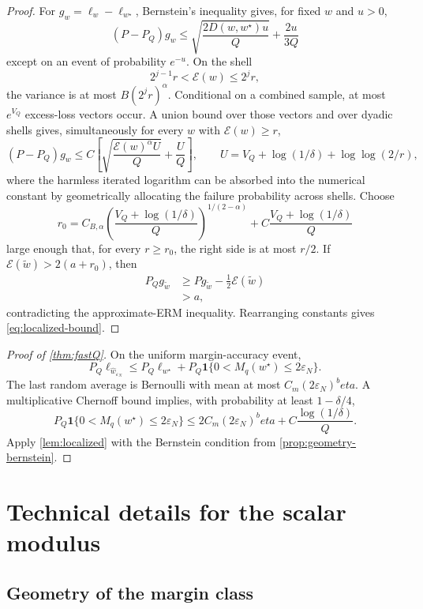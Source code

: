 \documentclass[11pt]{article}
\def\beta{beta}%
\newcommand{\one}{\mathbf 1}
\newcommand{\eps}{\varepsilon}
\begin{document}
\begin{proof}
For $g_w=\ell_w-\ell_{w^\star}$, Bernstein's inequality gives, for fixed $w$ and $u>0$,
\[
(P-P_Q)g_w
\le
\sqrt{\frac{2D(w,w^\star)u}{Q}}
+
\frac{2u}{3Q}
\]
except on an event of probability $e^{-u}$.  On the shell
\[
2^{j-1}r<\mathcal E(w)\le2^jr,
\]
the variance is at most $B(2^jr)^\alpha$.  Conditional on a combined sample, at most $e^{V_Q}$ excess-loss vectors occur.  A union bound over those vectors and over dyadic shells gives, simultaneously for every $w$ with $\mathcal E(w)\ge r$,
\[
(P-P_Q)g_w
\le
C\left[
\sqrt{\frac{\mathcal E(w)^\alpha U}{Q}}
+
\frac{U}{Q}
\right],
\qquad
U=V_Q+\log(1/\delta)+\log\log(2/r),
\]
where the harmless iterated logarithm can be absorbed into the numerical constant by geometrically allocating the failure probability across shells.  Choose
\[
r_0=C_{B,\alpha}
\left(\frac{V_Q+\log(1/\delta)}{Q}\right)^{1/(2-\alpha)}
+C\frac{V_Q+\log(1/\delta)}{Q}
\]
large enough that, for every $r\ge r_0$, the right side is at most $r/2$.  If $\mathcal E(\widetilde w)>2(a+r_0)$, then
\begin{align*}
P_Qg_{\widetilde w}
&\ge
Pg_{\widetilde w}-\frac12\mathcal E(\widetilde w)\\
&>
a,
\end{align*}
contradicting the approximate-ERM inequality.  Rearranging constants gives \eqref{eq:localized-bound}.
\end{proof}

\begin{proof}[Proof of \cref{thm:fastQ}]
On the uniform margin-accuracy event,
\[
P_Q\ell_{\widehat w_{\eps_N}}
\le
P_Q\ell_{w^\star}
+P_Q\one\{0<M_q(w^\star)\le2\eps_N\}.
\]
The last random average is Bernoulli with mean at most $C_m(2\eps_N)^\beta$.  A multiplicative Chernoff bound implies, with probability at least $1-\delta/4$,
\[
P_Q\one\{0<M_q(w^\star)\le2\eps_N\}
\le
2C_m(2\eps_N)^\beta
+C\frac{\log(1/\delta)}{Q}.
\]
Apply \cref{lem:localized} with the Bernstein condition from \cref{prop:geometry-bernstein}.
\end{proof}

\section{Technical details for the scalar modulus}
\label{app:scalar-modulus}

\subsection{Geometry of the margin class}
\end{document}
